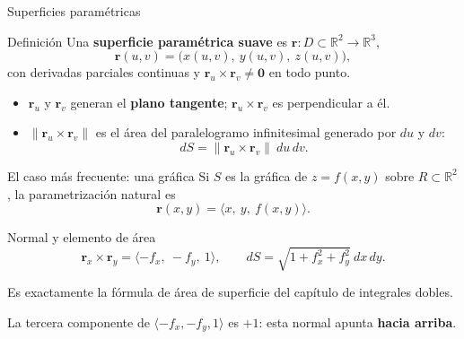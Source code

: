 \documentclass[11pt,aspectratio=169]{beamer}
\begin{document}
\begin{frame}{Superficies paramétricas}
  \begin{block}{Definición}
    Una \textbf{superficie paramétrica suave} es $\mathbf r:D\subset\mathbb R^2\to\mathbb R^3$,
    \[
      \mathbf r(u,v)=\bigl(x(u,v),\ y(u,v),\ z(u,v)\bigr),
    \]
    con derivadas parciales continuas y $\mathbf r_u\times\mathbf r_v\neq\mathbf 0$ en todo punto.
  \end{block}
  \pause
  \begin{itemize}
    \item $\mathbf r_u$ y $\mathbf r_v$ generan el \textbf{plano tangente}; $\mathbf r_u\times\mathbf r_v$ es perpendicular a él.
    \pause
    \item $\|\mathbf r_u\times\mathbf r_v\|$ es el área del paralelogramo infinitesimal generado por $du$ y $dv$:
    \[
      dS = \|\mathbf r_u\times\mathbf r_v\|\ du\,dv.
    \]
  \end{itemize}
  \pause
\end{frame}

\begin{frame}{El caso más frecuente: una gráfica}
  Si $S$ es la gráfica de $z=f(x,y)$ sobre $R\subset\mathbb R^2$, la parametrización natural es
  \[
    \mathbf r(x,y)=\langle x,\ y,\ f(x,y)\rangle.
  \]
  \pause
  \begin{block}{Normal y elemento de área}
    \[
      \mathbf r_x\times\mathbf r_y = \langle -f_x,\ -f_y,\ 1\rangle,
      \qquad
      dS = \sqrt{1+f_x^2+f_y^2}\ dx\,dy.
    \]
  \end{block}
  \pause
  \vspace{4pt}
  \begin{center}
  \normalsize\color{tealx} Es exactamente la fórmula de área de superficie del capítulo de integrales dobles.
  \end{center}
  \pause
  \begin{center}\small\color{gray60}
  La tercera componente de $\langle -f_x,-f_y,1\rangle$ es $+1$: esta normal apunta \textbf{hacia arriba}.
  \end{center}
\end{frame}
\end{document}
